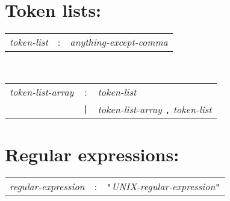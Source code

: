 %

\section*{Token lists:}
\begin{tabular}{p{4cm}cl}
\textit{token-list}
  &:& \textit{anything-except-comma}
\end{tabular}
\\
\begin{tabular}{p{4cm}cl}
\textit{token-list-array}
  &:& \textit{token-list} \\
  &\texttt{|}& \textit{token-list-array} \texttt{,} \textit{token-list}
\end{tabular}

\section*{Regular expressions:}
\begin{tabular}{p{4cm}cl}
\textit{regular-expression}
  &:& \texttt{"}\textit{UNIX-regular-expression}\texttt{"}
\end{tabular}

